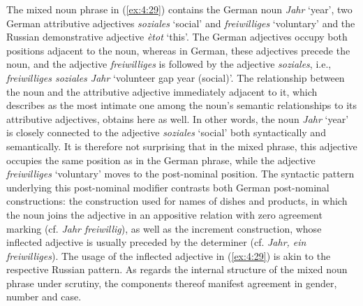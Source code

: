 \noindent The mixed noun phrase in (\ref{ex:4:29}) contains the German noun \textit{Jahr} `year', two German attributive adjectives \textit{soziales} `social' and \textit{freiwilliges} `voluntary' and the Russian demonstrative adjective \textit{ètot} `this'. The German adjectives occupy both positions adjacent to the noun, whereas in German, these adjectives precede the noun, and the adjective \textit{freiwilliges} is followed by the adjective \textit{soziales}, i.e., \textit{freiwilliges soziales Jahr} `volunteer gap year (social)'. The relationship between the noun and the attributive adjective immediately adjacent to it, which \citet{seiler1976} describes as the most intimate one among the noun's semantic relationships to its attributive adjectives, obtains here as well. In other words, the noun \textit{Jahr} `year' is closely connected to the adjective \textit{soziales} `social' both syntactically and semantically. It is therefore not surprising that in the mixed phrase, this adjective occupies the same position as in the German phrase, while the adjective \textit{freiwilliges} `voluntary' moves to the post-nominal position. The syntactic pattern underlying this post-nominal modifier contrasts both German post-nominal constructions: the construction used for names of dishes and products, in which the noun joins the adjective in an appositive relation with zero agreement marking (cf. \textit{Jahr freiwillig}), as well as the increment construction, whose inflected adjective is usually preceded by the determiner (cf. \textit{Jahr, ein freiwilliges}). The usage of the inflected adjective in (\ref{ex:4:29}) is akin to the respective Russian pattern. As regards the internal structure of the mixed noun phrase under scrutiny, the components thereof manifest agreement in gender, number and case. 

